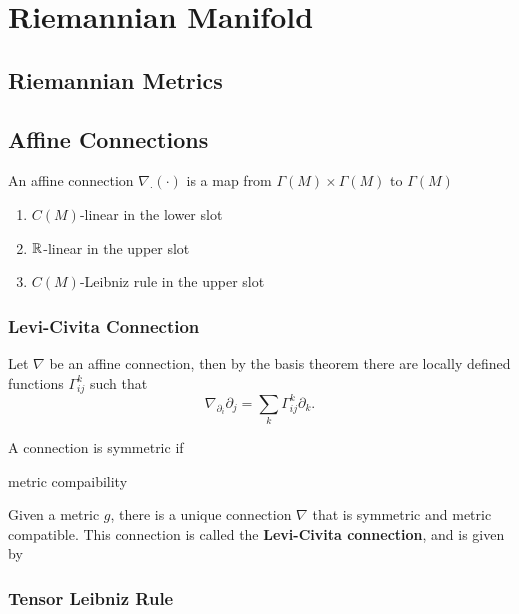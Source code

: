 \chapter{Riemannian Manifold}


\section{Riemannian Metrics}



\section{Affine Connections}

An affine connection $\nabla_{\cdot}(\cdot)$ is a map from $\Gamma(M)\times \Gamma(M)$ to $\Gamma(M)$ 

\begin{definition}
    \begin{enumerate}
        \item $C(M)$-linear in the lower slot 
        \item $\mathbb{R}$-linear in the upper slot
        \item $C(M)$-Leibniz rule in the upper slot 
    \end{enumerate}
\end{definition}

\subsection{Levi-Civita Connection}
Let $\nabla$ be an affine connection, then by the basis theorem there are locally defined functions $\Gamma^k_{ij}$ such that 
\begin{equation}
    \nabla_{\partial_i}\partial_j=\sum_k \Gamma^k_{ij}\partial_k.
\end{equation}

A connection is symmetric if 



metric compaibility

\begin{theorem}
    Given a metric $g$, there is a unique connection $\nabla$ that is symmetric and metric compatible.
    This connection is called the \textbf{Levi-Civita connection}, and is given by
\end{theorem}

\subsection{Tensor Leibniz Rule}


